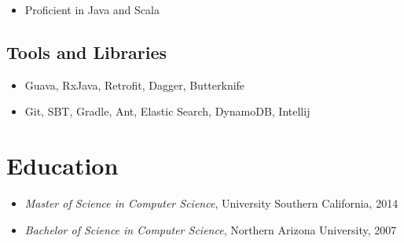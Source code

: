 \documentclass[11pt]{article}
\begin{document}
\begin{itemize}
\item Proficient in Java and Scala
\end{itemize}
\subsection*{Tools and Libraries}
\label{sec-2-2}

\begin{itemize}
\item Guava, RxJava, Retrofit, Dagger, Butterknife
\item Git, SBT, Gradle, Ant, Elastic Search, DynamoDB, Intellij
\end{itemize}
\section*{Education}
\label{sec-4}

\begin{itemize}
\item \emph{Master of Science in Computer Science}, University Southern California, 2014
\item \emph{Bachelor of Science in Computer Science}, Northern Arizona University, 2007
\end{itemize}
\end{document}
